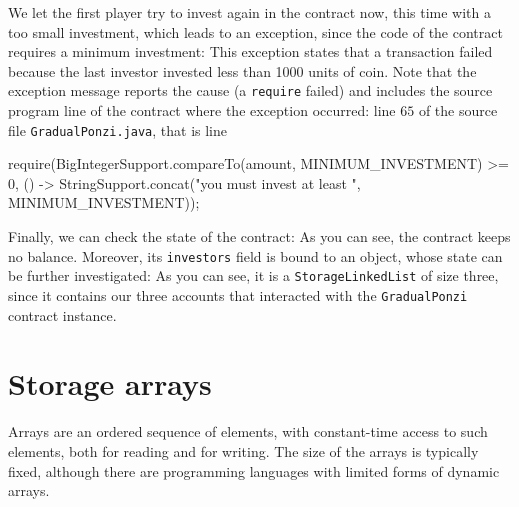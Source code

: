 We let the first player try to invest again in the contract now, this time
with a too small investment, which leads to an exception,
since the code of the contract requires a minimum investment:
%
%
This exception states that a transaction failed because the last
investor invested less than 1000 units of coin. Note that the
exception message reports the cause (a \texttt{require} failed)
and includes the source program line
of the contract where the exception occurred:
line $65$ of the source file \texttt{GradualPonzi.java}, that is line
%
\begin{codebox}\begin{javalst}
require(BigIntegerSupport.compareTo(amount, MINIMUM_INVESTMENT) >= 0,
  () -> StringSupport.concat("you must invest at least ", MINIMUM_INVESTMENT));
\end{javalst}\end{codebox}
%
Finally, we can check the state of the contract:
%
%
As you can see, the contract keeps no balance. Moreover, its \texttt{investors} field is bound to an
object, whose state can be further investigated:
%
%
As you can see, it is a \texttt{StorageLinkedList} of size three, since it contains
our three accounts that interacted with the \texttt{GradualPonzi} contract instance.

\section{Storage arrays}\label{sec:storage_arrays}

Arrays are an ordered sequence of elements, with constant-time access
to such elements, both for reading and for writing. The size of the arrays is typically
fixed, although there are programming languages with limited forms of dynamic arrays.


